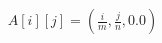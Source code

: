 \documentclass[preview]{standalone}
\begin{document}
\begin{align*}
A[i][j] = \left( \frac{i}{m}, \frac{j}{n}, 0.0 \right)
\end{align*}
\end{document}
